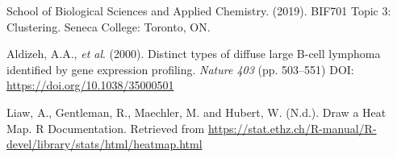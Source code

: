 \documentclass[11 pt,letterpaper,titlepage]{article} %
\begin{document}
\begin{thebibliography}{1}

     School of Biological Sciences and Applied Chemistry. (2019). BIF701 Topic 3: Clustering. Seneca College: Toronto, ON.

     Aldizeh, A.A., \textit{et al}. (2000). Distinct types of diffuse large B-cell lymphoma identified by gene expression profiling. \textit{Nature 403} (pp. 503–551)  DOI: \url{https://doi.org/10.1038/35000501}

     Liaw, A., Gentleman, R., Maechler, M. and Hubert, W. (N.d.). Draw a Heat Map. R Documentation. Retrieved from \url{https://stat.ethz.ch/R-manual/R-devel/library/stats/html/heatmap.html}

\end{thebibliography}

\appendix
\end{document}
